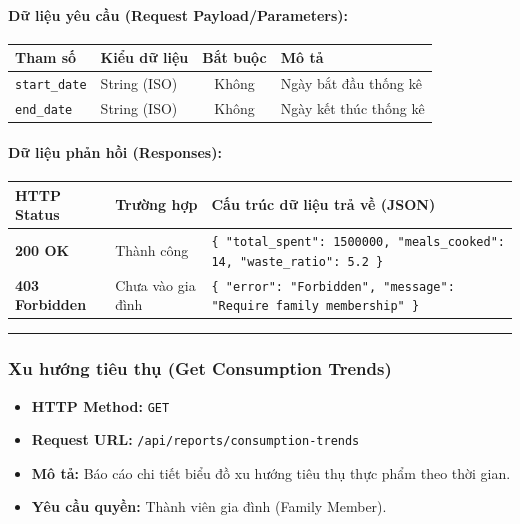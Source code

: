 \documentclass[12pt,a4paper]{article}
\begin{document}
\paragraph{Dữ liệu yêu cầu (Request Payload/Parameters):}
\begin{longtable}{|>{\raggedright\arraybackslash}p{2.8cm}|>{\raggedright\arraybackslash}p{2.2cm}|c|>{\raggedright\arraybackslash}p{7.0cm}|}
\hline
\textbf{Tham số} & \textbf{Kiểu dữ liệu} & \textbf{Bắt buộc} & \textbf{Mô tả} \\ \hline
\endhead
\texttt{start\_date} & String (ISO) & Không & Ngày bắt đầu thống kê \\ \hline
\texttt{end\_date} & String (ISO) & Không & Ngày kết thúc thống kê \\ \hline
\end{longtable}

\paragraph{Dữ liệu phản hồi (Responses):}
\begin{longtable}{|>{\raggedright\arraybackslash}p{2.8cm}|>{\raggedright\arraybackslash}p{3.2cm}|>{\raggedright\arraybackslash}p{8.0cm}|}
\hline
\textbf{HTTP Status} & \textbf{Trường hợp} & \textbf{Cấu trúc dữ liệu trả về (JSON)} \\ \hline
\endhead
\textbf{200 OK} & Thành công & \texttt{\{ "total\_spent": 1500000, "meals\_cooked": 14, "waste\_ratio": 5.2 \}} \\ \hline
\textbf{403 Forbidden} & Chưa vào gia đình & \texttt{\{ "error": "Forbidden", "message": "Require family membership" \}} \\ \hline
\end{longtable}

\vskip 0.4cm
\noindent\rule{\textwidth}{0.3pt}
\vskip 0.4cm

\subsubsection{Xu hướng tiêu thụ (Get Consumption Trends)}
\begin{itemize}[leftmargin=*]
    \item \textbf{HTTP Method:} \texttt{GET}
    \item \textbf{Request URL:} \texttt{/api/reports/consumption-trends}
    \item \textbf{Mô tả:} Báo cáo chi tiết biểu đồ xu hướng tiêu thụ thực phẩm theo thời gian.
    \item \textbf{Yêu cầu quyền:} Thành viên gia đình (Family Member).
\end{itemize}
\end{document}
